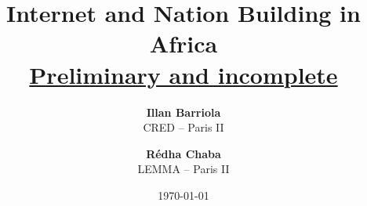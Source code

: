 \documentclass[11pt]{article}
\theoremstyle{plain}
\theoremstyle{plain}
\begin{document}
\title{Internet and Nation Building in Africa\\  \vspace{0.75cm} \underline{Preliminary and incomplete }}

\vspace{1cm}

\author{
\textbf{Illan Barriola} \\ CRED -- Paris II \\
\and \textbf{R\'{e}dha Chaba}\\ LEMMA -- Paris II \\
}

\date{ \today}

\maketitle
\end{document}
